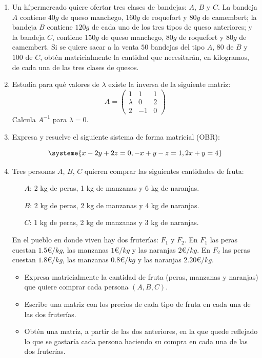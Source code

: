 \documentclass[8pt,a4paper]{article}
\begin{document}
	\begin{enumerate}

		\item Un hípermercado quiere ofertar tres clases de bandejas:  $A$, $B$ y $C$.  La bandeja $A$ contiene $40 g$ de queso manchego, $160 g$ de roquefort y $80 g$ de camembert; la bandeja $B$ contiene $120 g$ de cada uno de los tres tipos de queso anteriores; y la bandeja $C$, contiene $150 g$ de queso manchego, $80 g$ de roquefort y $80 g$ de camembert. Si se quiere sacar a la venta $50$ bandejas del tipo $A$, $80$ de $B$ y $100$ de $C$, obtén matricialmente la cantidad que necesitarán, en kilogramos, de cada una de las tres clases de quesos.

		\item Estudia para qué valores de $\lambda$ existe la inversa de la siguiente matriz:
%		
			\[A=\begin{pmatrix}
				1 & 1 & 1 \\
				\lambda & 0 & 2\\
				2 & -1 & 0
			\end{pmatrix}\]
%			
Calcula $A^{-1}$ para $\lambda=0$.

		\item Expresa y resuelve el siguiente sistema de forma matricial (OBR):

			\[ \systeme{x-2y+2z=0,-x+y-z=1, 2x+y=4}\]
			
		\item Tres personas $A$, $B$, $C$ quieren comprar las siguientes cantidades de fruta:
%
			\begin{itemize}
				\item[$A$:] 2 kg de peras, 1 kg de manzanas y 6 kg de naranjas.
				\item[$B$:] 2 kg de peras, 2 kg de manzanas y 4 kg de naranjas.
				\item[$C$:] 1 kg de peras, 2 kg de manzanas y 3 kg de naranjas.
			\end{itemize}
%			
En el pueblo en donde viven hay dos fruterías: $F_1$ y $F_2$. En $F_1$ las peras cuestan $1.5 €/kg$, las manzanas $1 €/kg$ y las naranjas $2 €/kg$. En $F_2$ las peras cuestan $1.8 €/kg$, las manzanas $0.8 €/kg$ y las naranjas $2.20 €/kg$.

			\begin{itemize}
				\item Expresa matricialmente la cantidad de fruta (peras, manzanas y naranjas) que quiere comprar cada persona $(A, B, C)$.
				\item Escribe una matriz con los precios de cada tipo de fruta en cada una de las dos fruterías.
				\item Obtén una matriz, a partir de las dos anteriores, en la que quede reflejado lo que se gastaría cada persona haciendo su compra en cada una de las dos fruterías.
			\end{itemize}
			

\end{enumerate}
\end{document}
